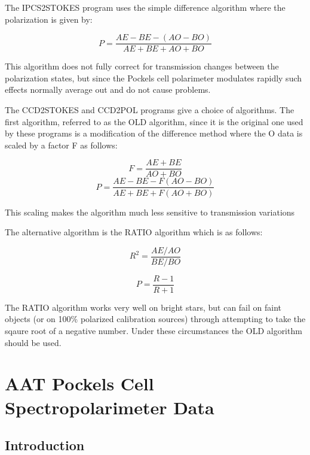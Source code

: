 \documentclass[11pt,twoside,nolof,noabs]{starlink}
\begin{document}
The IPCS2STOKES program uses the simple difference algorithm where the
polarization is given by:

\begin{equation}
P = \frac{AE-BE-(AO-BO)}{AE+BE+AO+BO}
\end{equation}

This algorithm does not fully correct for transmission changes between the
polarization states, but since the Pockels cell polarimeter modulates rapidly
such effects normally average out and do not cause problems.

The CCD2STOKES and CCD2POL programs give a choice of algorithms. The first
algorithm, referred to as the OLD algorithm, since it is the original one used
by these programs is a modification of the difference method where the O data
is scaled by a factor F as follows:

\begin{equation}
F = \frac{AE+BE}{AO+BO}
\end{equation}
\begin{equation}
P = \frac{AE-BE-F(AO-BO)}{AE+BE+F(AO+BO)}
\end{equation}

This scaling makes the algorithm much less sensitive to transmission variations

The alternative algorithm is the RATIO algorithm which is as follows:

\begin{equation}
R^2 = \frac{AE/AO}{BE/BO}
\end{equation}

\begin{equation}
P = \frac{R-1}{R+1}
\end{equation}

The RATIO algorithm works very well on bright stars, but can fail on faint objects
(or on 100\% polarized calibration sources) through attempting to take the
sqaure root of a negative number. Under these circumstances the OLD algorithm
should be used.

\section{AAT Pockels Cell Spectropolarimeter Data}

\subsection{Introduction}
\end{document}
